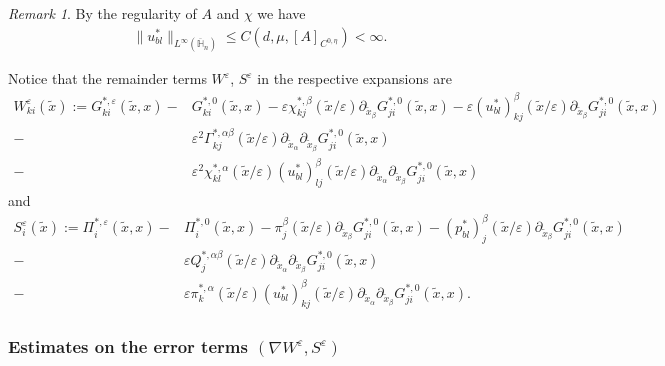 \documentclass[11pt, reqno]{amsart}
\theoremstyle{definition}
\theoremstyle{remark}
\newtheorem{remark}[theorem]{Remark}
\numberwithin{equation}{section}
\begin{document}
	\begin{remark}
		By the regularity of $A$ and $\chi$ we have 
		\begin{align}\label{bound_Linf_u}
			\|u^*_{bl} \|_{L^\infty(\overline{\mathbb{H}}_n)} \leq C(d, \mu, [A]_{C^{0,\eta}})<\infty.
		\end{align}
	\end{remark}
	
	
	
	\noindent Notice that the remainder terms $W^\varepsilon$, $S^\varepsilon$ in the respective expansions are
	\begin{align}
		W_{ki}^{\varepsilon} (\tilde{x}):=	G_{ki}^{*,\varepsilon} (\tilde{x},x)-& G_{ki}^{*,0} (\tilde{x},x)- \varepsilon	\chi^{*,\beta}_{kj}(\tilde{x}/\varepsilon)\partial_{\tilde{x}_{\beta}} G_{ji}^{*,0}  (\tilde{x},x) - \varepsilon	(u^*_{bl})^{\beta}_{kj}(\tilde{x}/\varepsilon)\partial_{\tilde{x}_{\beta}} G_{ji}^{*,0}  (\tilde{x},x)	\nonumber\\
		-&  \varepsilon^2 \Gamma^{*,\alpha\beta}_{kj}(\tilde{x}/\varepsilon) \partial_{\tilde{x}_{\alpha}}\partial_{\tilde{x}_\beta} G_{ji}^{*,0}  (\tilde{x},x)\nonumber\\ -& \varepsilon^2	\chi^{*,\alpha}_{kl}(\tilde{x}/\varepsilon)(u^*_{bl})^{\beta}_{lj}	(\tilde{x}/\varepsilon)  \partial_{\tilde{x}_{\alpha}}\partial_{\tilde{x}_\beta}G_{ji}^{*,0}  (\tilde{x},x)\label{errorW} 
	\end{align} 
	and 
	\begin{align}
		S_i^{\varepsilon} (\tilde{x}):=	\Pi_i^{*,\varepsilon} (\tilde{x},x)-&  \Pi_i^{*,0} (\tilde{x},x)-	\pi^{\beta}_{j}(\tilde{x}/\varepsilon)\partial_{\tilde{x}_\beta} G_{ji}^{*,0}   (\tilde{x},x)- (p_{bl}^*)^{\beta}_{j}(\tilde{x}/\varepsilon)\partial_{\tilde{x}_\beta}G_{ji}^{*,0}  (\tilde{x},x)\nonumber\\
		-	&	 \varepsilon Q^{*,\alpha\beta}_{j}(\tilde{x}/\varepsilon) \partial_{\tilde{x}_{\alpha}}\partial_{\tilde{x}_\beta}G_{ji}^{*,0}  (\tilde{x},x)\nonumber \\ -&  \varepsilon	\pi^{*,\alpha}_{k}(\tilde{x}/\varepsilon)	(u^*_{bl})^{\beta}_{kj}(\tilde{x}/\varepsilon)\partial_{\tilde{x}_{\alpha}}\partial_{\tilde{x}_\beta} G_{ji}^{*,0} (\tilde{x},x)	\label{errorP}.
	\end{align}
	
	
	
	
	
	
	\subsubsection{Estimates on the error terms  $ (\nabla W^{\varepsilon}, S^{\varepsilon}) $ }
	
\end{document}
